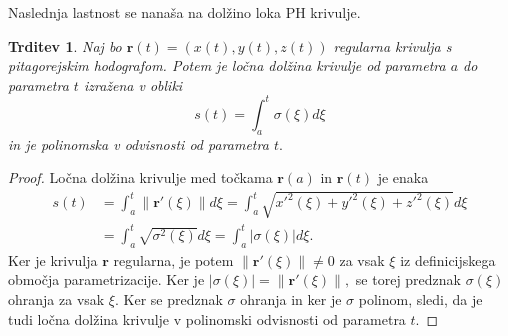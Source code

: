 \documentclass[12pt,a4paper,twoside]{article}
\theoremstyle{definition} %
\theoremstyle{plain} %
\newtheorem{trditev}[definicija]{Trditev}
\theoremstyle{primerstyle}
\numberwithin{equation}{section}  %
\newcommand{\rV}{\mathbf{r}}
\begin{document}
Naslednja lastnost se nanaša na dolžino loka PH krivulje.
\begin{trditev}
	Naj bo $\rV(t)=(x(t),y(t),z(t))$ regularna krivulja s pitagorejskim hodografom. Potem je ločna dolžina krivulje od parametra $a$ do parametra $t$ izražena v obliki
	\begin{equation}
		s(t)=\int_a^t\sigma(\xi)d\xi
	\end{equation}
	in je polinomska v odvisnosti od parametra $t.$
\end{trditev}
\begin{proof}
	Ločna dolžina krivulje med točkama $\rV(a)$ in $\rV(t)$ je enaka
	\begin{align}
		s(t)&=\int_a^t\lVert \rV'(\xi) \rVert d\xi=\int_a^t\sqrt{x'^2(\xi)+y'^2(\xi)+z'^2(\xi)}d\xi\nonumber\\
		&=\int_a^t\sqrt{\sigma^2(\xi)}d\xi=\int_a^t|\sigma(\xi)|d\xi.
	\end{align}
	Ker je krivulja $\rV$ regularna, je potem $\lVert \rV'(\xi) \rVert \neq 0$ za vsak $\xi$ iz definicijskega območja parametrizacije. Ker je $|\sigma(\xi)|=\lVert \rV'(\xi) \rVert,$ se torej predznak $\sigma(\xi)$ ohranja za vsak $\xi.$ Ker se predznak $\sigma$ ohranja in ker je $\sigma$ polinom, sledi, da je tudi ločna dolžina krivulje v polinomski odvisnosti od parametra $t.$
\end{proof}
\end{document}
